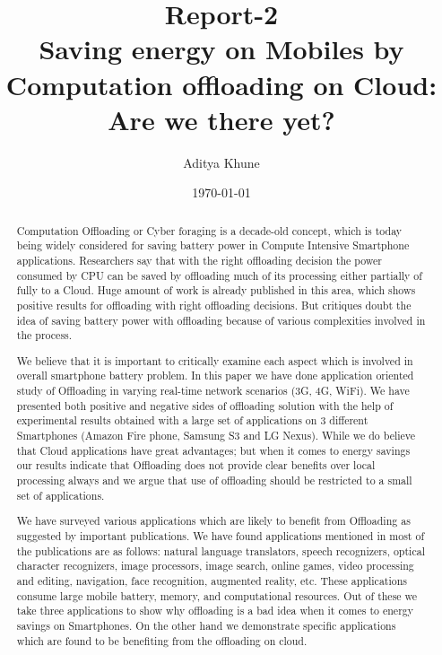 \documentclass[12pt]{report}
\begin{document}
\title{Report-2\\
Saving energy on Mobiles by Computation offloading on Cloud: Are we there yet? }

\author{Aditya Khune}

\date{\today}  %
\maketitle
\tableofcontents



\begin{abstract}
Computation Offloading or Cyber foraging is a decade-old concept, which is today being widely considered for saving battery power in Compute Intensive Smartphone applications. Researchers say that with the right offloading decision the power consumed by CPU can be saved by offloading much of its processing either partially of fully to a Cloud. Huge amount of work is already published in this area, which shows positive results for offloading with right offloading decisions. But critiques doubt the idea of saving battery power with offloading because of various complexities involved in the process.

We believe that it is important to critically examine each aspect which is involved in overall smartphone battery problem. In this paper we have done application oriented study of Offloading in varying real-time network scenarios (3G, 4G, WiFi). We have presented both positive and negative sides of offloading solution with the help of experimental results obtained with a large set of applications on 3 different Smartphones (Amazon Fire phone, Samsung S3 and LG Nexus). While we do believe that Cloud applications have great advantages; but when it comes to energy savings our results indicate that Offloading does not provide clear benefits over local processing always and we argue that use of offloading should be restricted to a small set of applications.

We have surveyed various applications which are likely to benefit from Offloading as suggested by important publications. We have found applications mentioned in most of the publications are as follows: natural language translators, speech recognizers, optical character recognizers, image processors, image search, online games, video processing and editing, navigation, face recognition, augmented reality, etc. These applications consume large mobile battery, memory, and computational resources.
Out of these we take three applications to show why offloading is a bad idea when it comes to energy savings on Smartphones. On the other hand we demonstrate specific applications which are found to be benefiting from the offloading on cloud.
\end{abstract}
\end{document}
